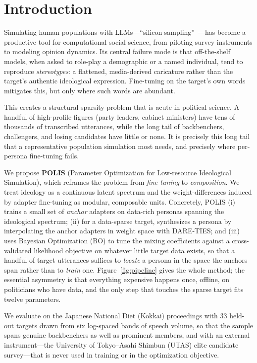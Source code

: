 \documentclass[11pt,letterpaper]{article}
\begin{document}
\section{Introduction}
Simulating human populations with LLMs---``silicon sampling''~\cite{argyle2023out}---has become a productive tool for computational social science, from piloting survey instruments to modeling opinion dynamics. Its central failure mode is that off-the-shelf models, when asked to role-play a demographic or a named individual, tend to reproduce \emph{stereotypes}: a flattened, media-derived caricature rather than the target's authentic ideological expression. Fine-tuning on the target's own words mitigates this, but only where such words are abundant.

This creates a structural sparsity problem that is acute in political science. A handful of high-profile figures (party leaders, cabinet ministers) have tens of thousands of transcribed utterances, while the long tail of backbenchers, challengers, and losing candidates have little or none. It is precisely this long tail that a representative population simulation most needs, and precisely where per-persona fine-tuning fails.

We propose \textbf{POLIS} (Parameter Optimization for Low-resource Ideological Simulation), which reframes the problem from \emph{fine-tuning} to \emph{composition}. We treat ideology as a continuous latent spectrum and the weight-differences induced by adapter fine-tuning as modular, composable units. Concretely, POLIS (i) trains a small set of \emph{anchor} adapters on data-rich personas spanning the ideological spectrum; (ii) for a data-sparse target, synthesizes a persona by interpolating the anchor adapters in weight space with DARE-TIES; and (iii) uses Bayesian Optimization (BO) to tune the mixing coefficients against a cross-validated likelihood objective on whatever little target data exists, so that a handful of target utterances suffices to \emph{locate} a persona in the space the anchors span rather than to \emph{train} one. Figure~\ref{fig:pipeline} gives the whole method; the essential asymmetry is that everything expensive happens once, offline, on politicians who have data, and the only step that touches the sparse target fits twelve parameters.

We evaluate on the Japanese National Diet (Kokkai) proceedings with 33 held-out targets drawn from six log-spaced bands of speech volume, so that the sample spans genuine backbenchers as well as prominent members, and with an external instrument---the University of Tokyo--Asahi Shimbun (UTAS) elite candidate survey---that is never used in training or in the optimization objective.
\end{document}
